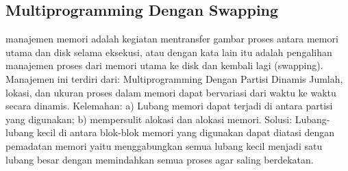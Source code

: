 \subsection {Multiprogramming Dengan Swapping}
manajemen memori adalah kegiatan mentransfer gambar proses antara memori utama dan disk selama eksekusi, atau dengan kata lain itu adalah pengalihan manajemen proses dari memori utama ke disk dan kembali lagi (swapping). Manajemen ini terdiri dari:
Multiprogramming Dengan Partisi Dinamis
Jumlah, lokasi, dan ukuran proses dalam memori dapat bervariasi dari waktu ke waktu secara dinamis. Kelemahan: a) Lubang memori dapat terjadi di antara partisi yang digunakan; b) mempersulit alokasi dan alokasi memori.
{Solusi}:
Lubang-lubang kecil di antara blok-blok memori yang digunakan dapat diatasi dengan pemadatan memori yaitu menggabungkan semua lubang kecil menjadi satu lubang besar dengan memindahkan semua proses agar saling berdekatan.
 
